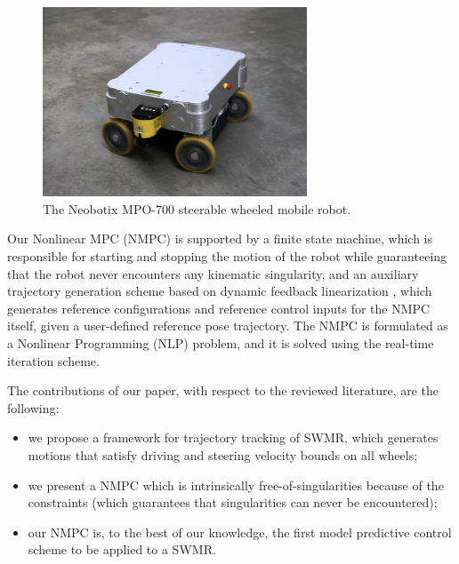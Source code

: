
\begin{figure}
    \centering
    \includegraphics[width=0.7\textwidth]{figures/SWMR/mpo-700.jpg}
    \caption{The Neobotix MPO-700 steerable wheeled mobile robot.}
    \label{fig:mpo-700}
\end{figure}

Our Nonlinear MPC (NMPC) is supported by a finite state machine, which is responsible for starting and stopping the motion of the robot while guaranteeing that the robot never encounters any kinematic singularity, and an auxiliary trajectory generation scheme based on dynamic feedback linearization \cite{Oriolo2002WMRControlDFL}, which generates reference configurations and reference control inputs for the NMPC itself, given a user-defined reference pose trajectory. The NMPC is formulated as a Nonlinear Programming (NLP) problem, and it is solved using the real-time iteration \cite{Gros2020Fromlineartononlinear} scheme.

The contributions of our paper, with respect to the reviewed literature, are the following:
\begin{itemize}
    \item we propose a framework for trajectory tracking of SWMR, which generates motions that satisfy driving and steering velocity bounds on all wheels;
    \item we present a NMPC which is intrinsically free-of-singularities because of the constraints (which guarantees that singularities can never be encountered);
    \item our NMPC is, to the best of our knowledge, the first model predictive control scheme to be applied to a SWMR.
\end{itemize}

